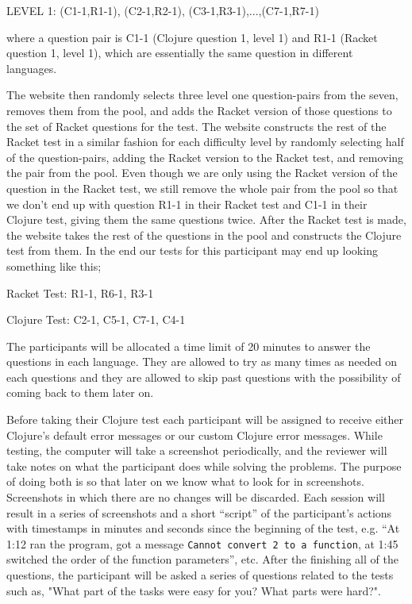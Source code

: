 \documentclass[submission,copyright,creativecommons]{eptcs}
\begin{document}
LEVEL 1: (C1-1,R1-1), (C2-1,R2-1), (C3-1,R3-1),...,(C7-1,R7-1)

where a question pair is C1-1 (Clojure question 1, level 1) and R1-1 (Racket question 1, level 1), which are essentially the same question in different languages.

The website then randomly selects three level one question-pairs from the seven, removes them from the pool, and adds the Racket version of those questions to the set of Racket questions for the test.
The website constructs the rest of the Racket test in a similar fashion for each difficulty level by randomly selecting half of the question-pairs, adding the Racket version to the  Racket test, and removing the pair from the pool.
Even though we are only using the Racket version of the question in the Racket test, we still remove the whole pair from the pool so that we don't end up with question R1-1 in their Racket test and C1-1 in their Clojure test, giving them the same questions twice. 
After the Racket test is made, the website takes the rest of the questions in the pool and constructs the Clojure test from them.
In the end our tests for this participant may end up looking something like this; 

Racket Test: R1-1, R6-1, R3-1

Clojure Test: C2-1, C5-1, C7-1, C4-1


	The participants will be allocated a time limit of 20 minutes to answer the questions in each language. 
They are allowed to try as many times as needed on each questions and they are allowed to skip past questions with the possibility of coming back to them later on. 

Before taking their Clojure test each participant will  be assigned to receive either Clojure's default error messages or our custom Clojure error messages.
While testing, the computer will take a screenshot periodically, and the reviewer will take notes on what the participant does while solving the problems.
The purpose of doing both is so that later on we know what to look for in screenshots. Screenshots in which there are no changes will be discarded. 
Each session will result in a series of screenshots and a short ``script'' of the participant's actions with timestamps in minutes and seconds since the beginning of the test, e.g. ``At 1:12 ran the program, got a message \texttt{Cannot convert 2 to a function}, at 1:45 switched the order of the function parameters'', etc.
After the finishing all of the questions, the participant will be asked a series of questions related to the tests such as, "What part of the tasks were easy for you? What parts were hard?".
\end{document}
